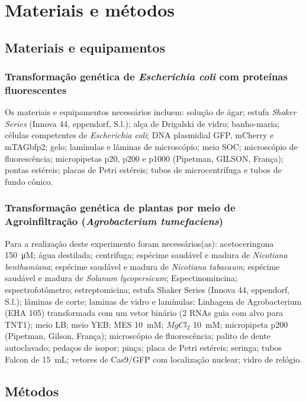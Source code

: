 \section{Materiais e métodos}
\subsection{Materiais e equipamentos}
\subsubsection{Transformação genética de \textit{Escherichia coli} com proteínas
fluorescentes}
Os materiais e equipamentos necessários incluem: solução de ágar; estufa
\textit{Shaker Series} (Innova 44, eppendorf, S.l.); alça de Drigalski de vidro;
banho-maria; células competentes de \textit{Escherichia coli}; DNA plasmidial
GFP, mCherry e mTAGbfp2; gelo; lamínulas e lâminas de microscópio; meio SOC;
microscópio de fluorescência; micropipetas p20, p200 e p1000 (Pipetman, GILSON,
França); pontas estéreis; placas de Petri estéreis; tubos de microcentrífuga e
tubos de fundo cônico.

\subsubsection{Transformação genética de plantas por meio de Agroinfiltração (\textit{Agrobacterium tumefaciens})}
Para a realização deste experimento foram necessários(as): acetoceringona
\qty{150}{\micro M}; água destilada; centrifuga; espécime saudável e madura de
\textit{Nicotiana benthamiana}; espécime saudável e madura de \textit{Nicotiana
tabacaum}; espécime saudável e madura de \textit{Solanum lycopersicum};
Espectinomincina; espectrofotômetro; estreptomicina; estufa Shaker Series
(Innova 44, eppendorf, S.l.); lâminas de corte; laminas de vidro e lamínulas;
Linhagem de Agrobacterium (EHA 105) transformada com um vetor binário (2 RNAs
guia com alvo para TNT1); meio LB; meio YEB; MES \qty{10}{mM}; $MgCl_2$
\qty{10}{mM}; micropipeta p200 (Pipetman, Gilson, França); microscópio de
fluorescência; palito de dente autoclavado; pedaços de isopor; pinça; placa de
Petri estéreis; seringa; tubos Falcon de \qty{15}{mL}; vetores de Cas9/GFP com
localização nuclear; vidro de relógio.

\subsection{Métodos}
